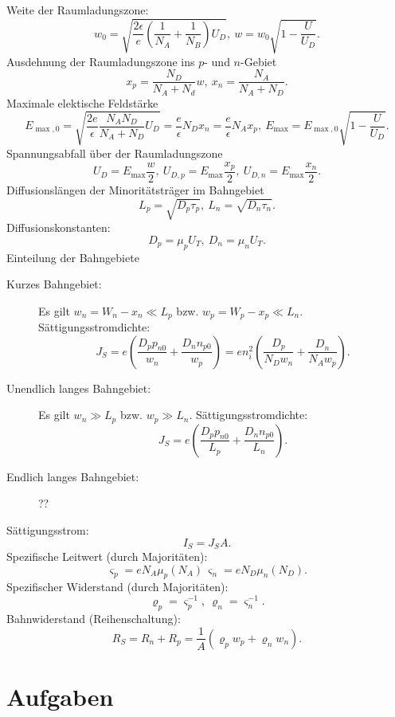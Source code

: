 \documentclass{article}
\begin{document}
Weite der Raumladungszone:
$$
w_0=\sqrt{\frac{2\epsilon}{e}\left(\frac 1 {N_A} + \frac 1 {N_B}\right)U_D},\ w=w_0\sqrt{1-\frac U {U_D}}.
$$
Ausdehnung der Raumladungszone ins $p$- und $n$-Gebiet
$$
x_p=\frac {N_D}{N_A+N_d}w,\ x_n=\frac {N_A}{N_A+N_D}.
$$
Maximale elektische Feldstärke
$$
E_{\max,0}=\sqrt{\frac {2e}{\epsilon}\frac {N_A N_D}{N_A+N_D}U_D}=\frac{e}{\epsilon}N_D x_n=\frac{e}{\epsilon} N_A x_p,\ E_{\max}=E_{\max,0}\sqrt{1-\frac U {U_D}}.
$$
Spannungsabfall über der Raumladungszone
$$
U_D = E_{\max}\frac w 2,\ U_{D,p}=E_{\max}\frac{x_p} 2,\ U_{D,n}=E_{\max}\frac{x_n} 2.
$$
Diffusionslängen der Minoritätsträger im Bahngebiet
$$
L_p=\sqrt{D_p\tau_p},\ L_n=\sqrt{D_n\tau_n}.
$$
Diffusionskonstanten:
$$
D_p=\mu_p U_T,\ D_n = \mu_n U_T.
$$
Einteilung der Bahngebiete
\begin{description}
        \item[Kurzes Bahngebiet:] Es gilt $w_n=W_n-x_n\ll L_p$ bzw. $w_p=W_p-x_p\ll L_n$.
    Sättigungsstromdichte:
    $$
    J_S=e\left(\frac{D_p p_{n0}}{w_n}+\frac{D_n n_{p0}}{w_p}\right)=en_i^2\left(\frac{D_p}{N_D w_n}+\frac{D_n}{N_A w_p}\right).
    $$

        \item[Unendlich langes Bahngebiet:] Es gilt $w_n \gg L_p$ bzw. $w_p \gg L_n$.
    Sättigungsstromdichte:
    $$
    J_S=e\left(\frac {D_p p_{n0}}{L_p}+\frac{D_n n_{p0}}{L_n}\right).
    $$
    \item[Endlich langes Bahngebiet:] ??
\end{description}
Sättigungsstrom:
$$
I_S=J_S A.
$$
Spezifische Leitwert (durch Majoritäten):
$$
\varsigma_p=e N_A \mu_p(N_A)\, \varsigma_n= e N_D \mu_n(N_D).
$$
Spezifischer Widerstand (durch Majoritäten):
$$
\varrho_p=\varsigma_p^{-1},\ \varrho_n=\varsigma_n^{-1}.
$$
Bahnwiderstand (Reihenschaltung):
$$
R_S=R_n+R_p=\frac{1}{A}(\varrho_p w_p+\varrho_n w_n).
$$

\section{Aufgaben}

\def\theexercisecontext{D}
\end{document}
